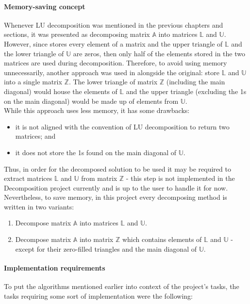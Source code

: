 \paragraph{Memory-saving concept} Whenever LU decomposition was mentioned in the previous chapters and sections, it was presented as decomposing matrix $ \mathbb{A} $ into matrices $ \mathbb{L} $ and $ \mathbb{U} $. However, since  stores every element of a matrix and the upper triangle of $ \mathbb{L} $ and the lower triangle of $ \mathbb{U} $ are zeros, then only half of the elements stored in the two matrices are used during decomposition. Therefore, to avoid using memory unnecessarily, another approach was used in alongside the original: store $ \mathbb{L} $ and $ \mathbb{U} $ into a single matrix $ \mathbb{Z} $. The lower triangle of matrix $ \mathbb{Z} $ (including the main diagonal) would house the elements of $ \mathbb{L} $ and the upper triangle (excluding the 1s on the main diagonal) would be made up of elements from $ \mathbb{U} $. \\
While this approach uses less memory, it has some drawbacks:

\begin{itemize}
	\item it is not aligned with the convention of LU decomposition to return two matrices; and
	\item it does not store the 1s found on the main diagonal of $ \mathbb{U} $.
\end{itemize}

Thus, in order for the decomposed solution to be used it may be required to extract matrices $ \mathbb{L} $ and $ \mathbb{U} $ from matrix $ \mathbb{Z} $ - this step is not implemented in the Decomposition project currently and is up to the user to handle it for now. \\
Nevertheless, to save memory, in this project every decomposing method is written in two variants:

\begin{enumerate}
	\item Decompose matrix $ \mathbb{A} $ into matrices $ \mathbb{L} $ and $ \mathbb{U} $.
	\item Decompose matrix $ \mathbb{A} $ into matrix $ \mathbb{Z} $ which contains elements of $ \mathbb{L} $ and $ \mathbb{U} $ - except for their zero-filled triangles and the main diagonal of $ \mathbb{U} $.
\end{enumerate}

\paragraph{Implementation requirements}\label{Paragraph:implementation-decomposition-project-lu-decomposition-implementation-requirements} To put the algorithms mentioned earlier into context of the project's tasks, the tasks requiring some sort of implementation were the following:

